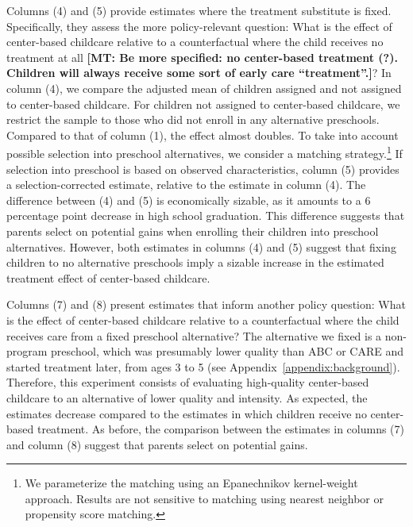\noindent Columns (4) and (5) provide estimates where the treatment substitute is fixed. Specifically, they assess the more policy-relevant question: What is the effect of center-based childcare relative to a counterfactual where the child receives no treatment at all \textbf{[MT: Be more specified: no center-based treatment (?). Children will always receive some sort of early care ``treatment''.]}? In column (4), we compare the adjusted mean of children assigned and not assigned to center-based childcare. For children not assigned to center-based childcare, we restrict the sample to those who did not enroll in any alternative preschools. Compared to that of column (1), the effect almost doubles. To take into account possible selection into preschool alternatives, we consider a matching strategy.\footnote{We parameterize the matching using an Epanechnikov kernel-weight approach. Results are not sensitive to matching using nearest neighbor or propensity score matching.} If selection into preschool is based on observed characteristics, column (5) provides a selection-corrected estimate, relative to the estimate in column (4). The difference between (4) and (5) is economically sizable, as it amounts to a 6 percentage point decrease in high school graduation. This difference suggests that parents select on potential gains when enrolling their children into preschool alternatives. However, both estimates in columns (4) and (5) suggest that fixing children to no alternative preschools imply a sizable increase in the estimated treatment effect of center-based childcare. 

\noindent Columns (7) and (8) present estimates that inform another policy question: What is the effect of center-based childcare relative to a counterfactual where the child receives care from a fixed preschool alternative? The alternative we fixed is a non-program preschool, which was presumably lower quality than ABC or CARE and started treatment later, from ages 3 to 5 (see Appendix~\ref{appendix:background}). Therefore, this experiment consists of evaluating high-quality center-based childcare to an alternative of lower quality and intensity. As expected, the estimates decrease compared to the estimates in which children receive no center-based treatment. As before, the comparison between the estimates in columns (7) and column (8) suggest that parents select on potential gains.\\

